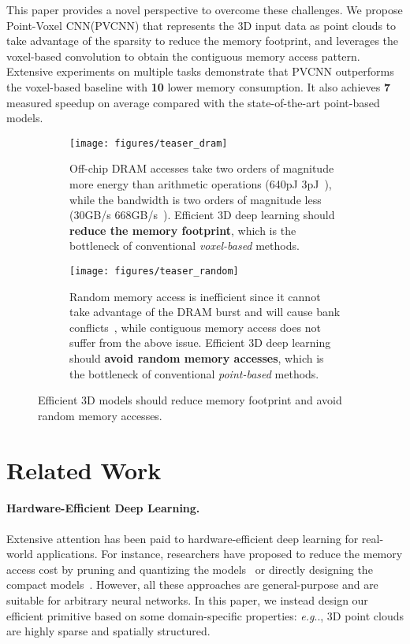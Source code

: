 \documentclass{article}
\makeatletter
\DeclareRobustCommand\onedot{\futurelet\@let@token\@onedot}
\def\@onedot{\ifx\@let@token.\else.\null\fi\xspace}
\def\eg{\emph{e.g}\onedot} \def\Eg{\emph{E.g}\onedot}
\def\model{Point-Voxel CNN\xspace}
\def\modelshort{PVCNN\xspace}
\makeatother
\begin{document}
This paper provides a novel perspective to overcome these challenges. We propose \model (\modelshort) that represents the 3D input data as point clouds to take advantage of the sparsity to reduce the memory footprint, and leverages the voxel-based convolution to obtain the contiguous memory access pattern. Extensive experiments on multiple tasks demonstrate that \modelshort outperforms the voxel-based baseline with \textbf{10} lower memory consumption. It also achieves \textbf{7} measured speedup on average compared with the state-of-the-art point-based models.

\begin{figure}[t]
\centering
\begin{subfigure}[b]{0.49\textwidth}
    \centering
    \texttt{[image: figures/teaser\_dram]}
    \caption{Off-chip DRAM accesses take two orders of magnitude more energy than arithmetic operations (640pJ \vs 3pJ~\cite{Horowitz:2014co}), while the bandwidth is two orders of magnitude less (30GB/s \vs 668GB/s~\cite{Jouppi:2017da}). Efficient 3D deep learning should \textbf{reduce the memory footprint}, which is the bottleneck of conventional \textit{voxel-based} methods.}
    \label{fig:teaser:a}
\end{subfigure}
\hfill
\begin{subfigure}[b]{0.49\textwidth}
    \centering
    \texttt{[image: figures/teaser\_random]}
    \caption{Random memory access is inefficient since it cannot take advantage of the DRAM burst and will cause bank conflicts~\cite{DDR}, while contiguous memory access does not suffer from the above issue. Efficient 3D deep learning should \textbf{avoid random memory accesses}, which is the bottleneck of  conventional \textit{point-based} methods.}
    \label{fig:teaser:b}
\end{subfigure}
\caption{Efficient 3D models should reduce memory footprint and avoid random memory accesses.}
\label{fig:teaser}
\vspace{-10pt}
\end{figure}
  \section{Related Work}

\paragraph{Hardware-Efficient Deep Learning.} 

Extensive attention has been paid to hardware-efficient deep learning for real-world applications. For instance, researchers have proposed to reduce the memory access cost by pruning and quantizing the models~\cite{Han:2015pn,Han:2016uf,He:2018am,Lin:2016fp,Zhou:2017it,Wang:2019ha} or directly designing the compact models~\cite{Iandola:2016sq,Howard:2017mn,Sandler:2018ir,Howard:2019sf,Zhang:2018md,Ma:2018sn}. However, all these approaches are general-purpose and are suitable for arbitrary neural networks. In this paper, we instead design our efficient primitive based on some domain-specific properties: \eg, 3D point clouds are highly sparse and spatially structured.
\end{document}
